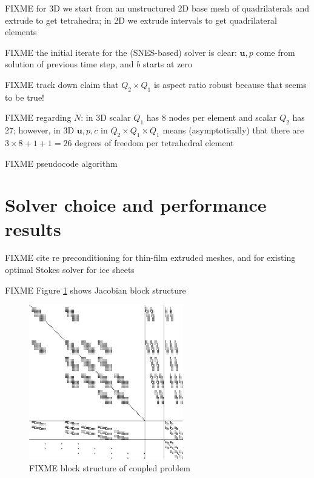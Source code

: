 \documentclass[letterpaper,final,12pt,reqno]{amsart}
\newcommand{\bu}{\mathbf{u}}
\begin{document}
FIXME for 3D we start from an unstructured 2D base mesh of quadrilaterals and extrude to get tetrahedra; in 2D we extrude intervals to get quadrilateral elements

FIXME the initial iterate for the (SNES-based) solver is clear: $\bu,p$ come from solution of previous time step, and $b$ starts at zero

FIXME track down \cite{IsaacStadlerGhattas2015} claim that $Q_2\times Q_1$ is aspect ratio robust because that seems to be true!

FIXME regarding $N$: in 3D scalar $Q_1$ has 8 nodes per element and scalar $Q_2$ has 27; however, in 3D $\bu,p,c$ in $Q_2\times Q_1 \times Q_1$ means (asymptotically) that there are $3\times 8 + 1 + 1 = 26$ degrees of freedom per tetrahedral element

FIXME pseudocode algorithm


\section{Solver choice and performance results} \label{sec:results}

FIXME cite \cite{Tuminaroetal2016} re preconditioning for thin-film extruded meshes, and \cite{IsaacStadlerGhattas2015} for existing optimal Stokes solver for ice sheets

FIXME Figure \ref{fig:blockstructure} shows Jacobian block structure

\begin{figure}[ht]
\begin{center}
\includegraphics[width=0.6\textwidth]{figs/coarsespy.pdf}
\end{center}
\caption{FIXME block structure of coupled problem}
\label{fig:blockstructure}
\end{figure}
\end{document}
